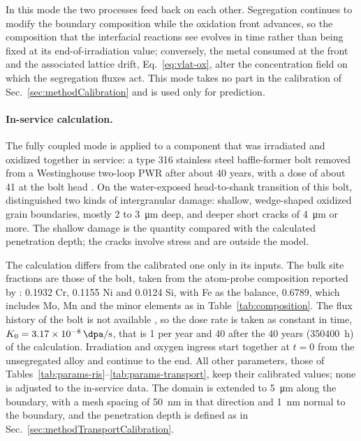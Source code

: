 \documentclass[3p,times]{elsarticle} %
\newcommand{\textcite}[1]{\citet{#1}}
\begin{document}
In this mode the two processes feed back on each other. Segregation continues to
modify the boundary composition while the oxidation front advances, so the composition
that the interfacial reactions see evolves in time rather than being fixed at its
end-of-irradiation value; conversely, the metal consumed at the front and the
associated lattice drift, Eq.~\eqref{eq:vlat-ox}, alter the concentration field on
which the segregation fluxes act. This mode takes no part in the calibration of
Sec.~\ref{sec:methodCalibration} and is used only for prediction.

\paragraph{In-service calculation.}
The fully coupled mode is applied to a component that was irradiated and
oxidized together in service: a type 316 stainless steel baffle-former bolt
removed from a Westinghouse two-loop PWR after about 40 years, with a dose of
about \SI{41}{\dpa} at the bolt head
\cite{gussev2023microstructure,lach2024inservice,lach2025inservice}. On
the water-exposed head-to-shank transition of this bolt,
\textcite{gussev2023microstructure} distinguished two kinds of intergranular
damage: shallow, wedge-shaped oxidized grain boundaries, mostly 2 to
\SI{3}{\micro\metre} deep, and deeper short cracks of \SI{4}{\micro\metre} or
more. The shallow damage is the quantity compared with the calculated
penetration depth; the cracks involve stress and are outside the model.

The calculation differs from the calibrated one only in its inputs. The bulk
site fractions are those of the bolt, taken from the atom-probe composition
reported by \textcite{lach2024inservice}: 0.1932 Cr, 0.1155 Ni and 0.0124 Si,
with Fe as the balance, 0.6789, which includes Mo, Mn and the minor elements
as in Table~\ref{tab:composition}. The flux history of the bolt is not
available \cite{gussev2023microstructure}, so the dose rate is taken as
constant in time, \(K_0=\SI{3.17e-8}{\dpa\per\second}\), that is
\SI{1}{\dpa} per year and \SI{40}{\dpa} after the 40 years
(\SI{350400}{h}) of the calculation. Irradiation and oxygen ingress
start together at \(t=0\) from the unsegregated alloy and continue to the end.
All other parameters, those of
Tables~\ref{tab:params-ris}--\ref{tab:params-transport}, keep their
calibrated values; none is adjusted to the in-service data. The domain is
extended to \SI{5}{\micro\metre} along the boundary, with a mesh spacing of
\SI{50}{nm} in that direction and \SI{1}{nm} normal to the boundary, and the
penetration depth is defined as in
Sec.~\ref{sec:methodTransportCalibration}.
\end{document}
